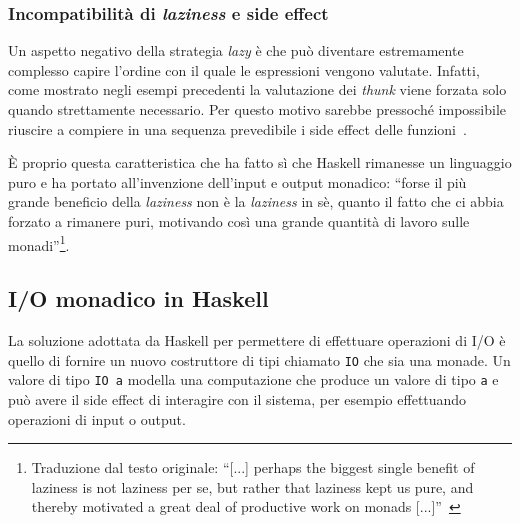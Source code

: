 \subsubsection{Incompatibilità di \emph{laziness} e side effect}
Un aspetto negativo della strategia \emph{lazy} è che può diventare estremamente complesso capire l'ordine con il quale le espressioni vengono valutate. Infatti, come mostrato negli esempi precedenti la valutazione dei \emph{thunk} viene forzata solo quando strettamente necessario. Per questo motivo sarebbe pressoché impossibile riuscire a compiere in una sequenza prevedibile i side effect delle funzioni~\cite{cit:tackling-the-awkward-squad}.

È proprio questa caratteristica che ha fatto sì che Haskell rimanesse un linguaggio puro e ha portato all'invenzione dell'input e output monadico: ``forse il più grande beneficio della \emph{laziness} non è la \emph{laziness} in sè, quanto il fatto che ci abbia forzato a rimanere puri, motivando così una grande quantità di lavoro sulle monadi''\footnote{Traduzione dal testo originale: ``[...] perhaps the biggest single benefit of laziness is not laziness per se, but rather that laziness kept us pure, and thereby motivated a great deal of productive work on monads [...]''~\cite{cit:a-history-of-haskell-being-lazy-with-class}}.

\subsection{I/O monadico in Haskell}
\label{sub:io-monadico-haskell}
La soluzione adottata da Haskell per permettere di effettuare operazioni di I/O è quello di fornire un nuovo costruttore di tipi chiamato \lstinline{IO} che sia una monade. Un valore di tipo \lstinline{IO a} modella una computazione che produce un valore di tipo \lstinline{a} e può avere il side effect di interagire con il sistema, per esempio effettuando operazioni di input o output.

